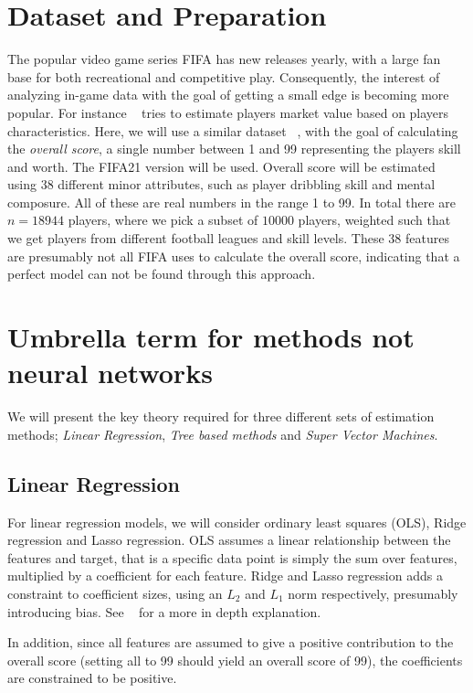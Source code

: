     \section{Dataset and Preparation}
        The popular video game series FIFA has new releases yearly, with a large fan base for both recreational and competitive play. Consequently, the interest of analyzing in-game data with the goal of getting a small edge is becoming more popular. For instance ~\citep{fifa21playersvalue} tries to estimate players market value based on players characteristics. Here, we will use a similar dataset ~\citep{fifa21_data}, with the goal of calculating the \textit{overall score}, a single number between 1 and 99 representing the players skill and worth. The FIFA21 version will be used. Overall score will be estimated using 38 different minor attributes, such as player dribbling skill and mental composure. All of these are real numbers in the range 1 to 99. In total there are $n = 18944$ players, where we pick a subset of $10000$ players, weighted such that we get players from different football leagues and skill levels. These 38 features are presumably not all FIFA uses to calculate the overall score, indicating that a perfect model can not be found through this approach. 
        
    \section{Umbrella term for methods not neural networks}
        We will present the key theory required for three different sets of estimation methods; \textit{Linear Regression}, \textit{Tree based methods} and \textit{Super Vector Machines}.
        \subsection{Linear Regression}
            For linear regression models, we will consider ordinary least squares (OLS), Ridge regression and Lasso regression. OLS assumes a linear relationship between the features and target, that is a specific data point is simply the sum over features, multiplied by a coefficient for each feature. Ridge and Lasso regression adds a constraint to coefficient sizes, using an $L_2$ and $L_1$ norm respectively, presumably introducing bias. See ~\citep{Project1} for a more in depth explanation.
            
            In addition, since all features are assumed to give a positive contribution to the overall score (setting all to 99 should yield an overall score of 99), the coefficients are constrained to be positive.  
